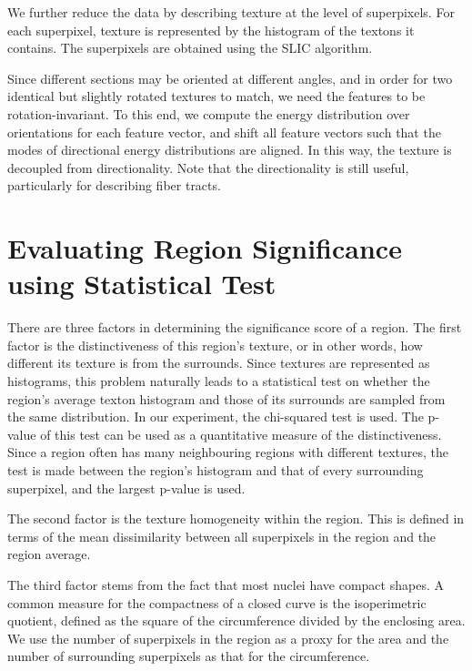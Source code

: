 \documentclass{llncs}
\begin{document}

We further reduce the data by describing texture at the level of superpixels. For each superpixel, texture is represented by the histogram of the textons it contains. The superpixels are obtained using the SLIC algorithm. 

Since different sections may be oriented at different angles, and in order for two identical but slightly rotated textures to match, we need the features to be rotation-invariant. To this end, we compute the energy distribution over orientations for each feature vector, and shift all feature vectors such that the modes of directional energy distributions are aligned. In this way, the texture is decoupled from directionality. Note that the directionality is still useful, particularly for describing fiber tracts.

\section{Evaluating Region Significance using Statistical Test}

There are three factors in determining the significance score of a region. The first factor is the distinctiveness of this region's texture, or in other words, how different its texture is from the surrounds. Since textures are represented as histograms, this problem naturally leads to a statistical test on whether the region's average texton histogram and those of its surrounds are sampled from the same distribution. In our experiment, the chi-squared test is used. The p-value of this test can be used as a quantitative measure of the distinctiveness. Since a region often has many neighbouring regions with different textures, the test is made between the region's histogram and that of every surrounding superpixel, and the largest p-value is used. 

The second factor is the texture homogeneity within the region. This is defined in terms of the mean dissimilarity between all superpixels in the region and the region average.

The third factor stems from the fact that most nuclei have compact shapes. A common measure for the compactness of a closed curve is the isoperimetric quotient, defined as the square of the circumference divided by the enclosing area. We use the number of superpixels in the region as a proxy for the area and the number of surrounding superpixels as that for the circumference.
\end{document}
